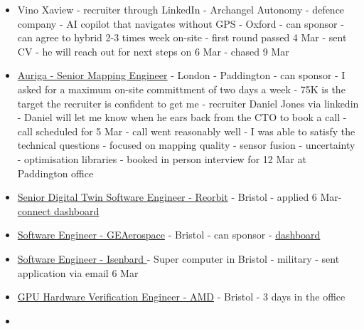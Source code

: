 \begin{itemize}
    those roles
    \href{https://job-boards.eu.greenhouse.io/dexory/jobs/4700489101}{Dexory-
    Senior Robotics/Autonomy Engineer - Wallingford} - expertise fits with
    advertised role -  (also non-senior position
    \href{https://job-boards.eu.greenhouse.io/dexory/jobs/4700494101}{advert})
  \item
  Vino Xaview - recruiter through LinkedIn - Archangel Autonomy - defence
    company - AI copilot that navigates without GPS - Oxford - can sponsor - can
    agree to hybrid 2-3 times week on-site - first round passed 4 Mar - sent CV
    - he will reach out for next steps on 6 Mar - chased 9 Mar
  \item
    \href{https://www.auriga.xyz/role-004-senior-mapping-engineer}{Auriga -
    Senior Mapping Engineer} - London - Paddington - can sponsor - I asked for a
    maximum on-site committment of two days a week - 75K is the target the
    recruiter is confident to get me - recruiter Daniel Jones via linkedin -
    Daniel will let me know when he ears back from the CTO to book a call -
    call scheduled for 5 Mar - call went reasonably well - I was able to satisfy
    the technical questions - focused on mapping quality - sensor fusion -
    uncertainty - optimisation libraries - booked in person interview for 12 Mar
    at Paddington office
  \item
    \href{https://careers.reorbit.space/jobs/7188700-senior-digital-twin-software-engineer}{
      Senior Digital Twin Software Engineer - Reorbit}
    - Bristol - applied 6 Mar-
    \href{https://careers.reorbit.space/connect/dashboard}{connect dashboard}
  \item
    \href{https://careers.geaerospace.com/global/en/job/R5027433/Software-Engineer}{
    Software Engineer - GEAerospace} - Bristol - can sponsor -
    \href{https://geaerospace.wd5.myworkdayjobs.com/en-US/GE_ExternalSite/userHome?_gl=1*1hep3j4*_ga*MTEyNTAxMDM3LjE3NzI4MDI1MDI.*_ga_KCKV6SE721*czE3NzI4MDI1MDIkbzEkZzEkdDE3NzI4MDMxMzQkajQyJGwwJGgw&Job_Application_ID=bebc354c39e19001ea12b42d12e00006}{dashboard}
  \item
    \href{https://antique-rhinoceros-a44.notion.site/Software-Engineer-UK-2fcfea6b0c5480d9a58ddabcc053872d}
    {Software Engineer - Isenbard } - Super computer in Bristol - military -
    sent application via email 6 Mar
  \item
    \href{https://careers.amd.com/careers-home/jobs/72071?lang=en-us}{GPU
    Hardware Verification Engineer - AMD} - Bristol - 3 days in the office
  \item

\end{itemize}
